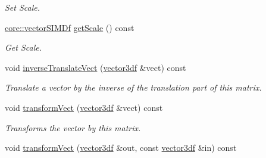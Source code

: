 \begin{DoxyCompactItemize}
\begin{DoxyCompactList}\small\item\em Set Scale. \end{DoxyCompactList}\item 
\hyperlink{classirr_1_1core_1_1vectorSIMDf}{core\+::vector\+S\+I\+M\+Df} \hyperlink{classirr_1_1core_1_1matrixSIMD4_ae679b755d86ddd9f4246520e67e9354e}{get\+Scale} () const \hypertarget{classirr_1_1core_1_1matrixSIMD4_ae679b755d86ddd9f4246520e67e9354e}{}\label{classirr_1_1core_1_1matrixSIMD4_ae679b755d86ddd9f4246520e67e9354e}

\begin{DoxyCompactList}\small\item\em Get Scale. \end{DoxyCompactList}\item 
void \hyperlink{classirr_1_1core_1_1matrixSIMD4_afd588a00b56809139113605e5fe46c68}{inverse\+Translate\+Vect} (\hyperlink{namespaceirr_1_1core_a06f169d08b5c429f5575acb7edbad811}{vector3df} \&vect) const \hypertarget{classirr_1_1core_1_1matrixSIMD4_afd588a00b56809139113605e5fe46c68}{}\label{classirr_1_1core_1_1matrixSIMD4_afd588a00b56809139113605e5fe46c68}

\begin{DoxyCompactList}\small\item\em Translate a vector by the inverse of the translation part of this matrix. \end{DoxyCompactList}\item 
void \hyperlink{classirr_1_1core_1_1matrixSIMD4_a32232cc086c8906376dfba55f269d962}{transform\+Vect} (\hyperlink{namespaceirr_1_1core_a06f169d08b5c429f5575acb7edbad811}{vector3df} \&vect) const \hypertarget{classirr_1_1core_1_1matrixSIMD4_a32232cc086c8906376dfba55f269d962}{}\label{classirr_1_1core_1_1matrixSIMD4_a32232cc086c8906376dfba55f269d962}

\begin{DoxyCompactList}\small\item\em Transforms the vector by this matrix. \end{DoxyCompactList}\item 
void \hyperlink{classirr_1_1core_1_1matrixSIMD4_a1d6d3fd92f18e06b02977588a77029aa}{transform\+Vect} (\hyperlink{namespaceirr_1_1core_a06f169d08b5c429f5575acb7edbad811}{vector3df} \&out, const \hyperlink{namespaceirr_1_1core_a06f169d08b5c429f5575acb7edbad811}{vector3df} \&in) const \hypertarget{classirr_1_1core_1_1matrixSIMD4_a1d6d3fd92f18e06b02977588a77029aa}{}\label{classirr_1_1core_1_1matrixSIMD4_a1d6d3fd92f18e06b02977588a77029aa}


\end{DoxyCompactItemize}
